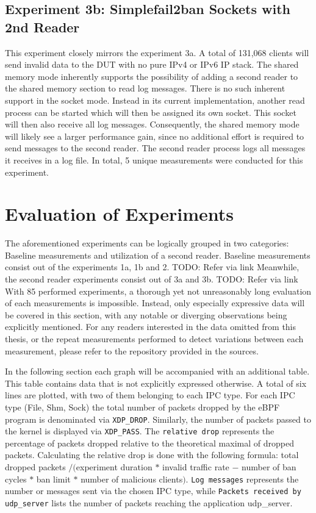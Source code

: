\subsection{Experiment 3b: Simplefail2ban Sockets with 2nd Reader}
This experiment closely mirrors the experiment 3a.
A total of 131,068 clients will send invalid data to the DUT with no pure IPv4 or IPv6 IP stack.
The shared memory mode inherently supports the possibility of adding a second reader to the shared memory section to read log messages.
There is no such inherent support in the socket mode.
Instead in its current implementation, another read process can be started which will then be assigned its own socket.
This socket will then also receive all log messages.
Consequently, the shared memory mode will likely see a larger performance gain, since no additional effort is required to send messages to the second reader. 
The second reader process logs all messages it receives in a log file.
In total, 5 unique measurements were conducted for this experiment.

\newpage
\section{Evaluation of Experiments}
The aforementioned experiments can be logically grouped in two categories\@: Baseline measurements and utilization of a second reader.
Baseline measurements consist out of the experiments 1a, 1b and 2. TODO: Refer via link
Meanwhile, the second reader experiments consist out of 3a and 3b. TODO: Refer via link
With 85 performed experiments, a thorough yet not unreasonably long evaluation of each measurements is impossible.
Instead, only especially expressive data will be covered in this section, with any notable or diverging observations being explicitly mentioned.
For any readers interested in the data omitted from this thesis, or the repeat measurements performed to detect variations between each measurement, please refer to the repository provided in the sources\cite{git:repoOfThesis}.

In the following section each graph will be accompanied with an additional table.
This table contains data that is not explicitly expressed otherwise.
A total of six lines are plotted, with two of them belonging to each IPC type.
For each IPC type (File, Shm, Sock) the total number of packets dropped by the eBPF program is denominated via \texttt{XDP\_DROP}.
Similarly, the number of packets passed to the kernel is displayed via \texttt{XDP\_PASS}.
The \texttt{relative drop} represents the percentage of packets dropped relative to the theoretical maximal of dropped packets.
Calculating the relative drop is done with the following formula:
total dropped packets $/ ($experiment duration $*$ invalid traffic rate $-$ number of ban cycles $*$ ban limit $*$ number of malicious clients$)$.
\texttt{Log messages} represents the number or messages sent via the chosen IPC type, while \texttt{Packets received by udp\_server} lists the number of packets reaching the application udp\_server.

